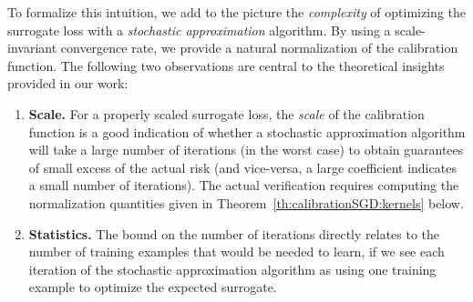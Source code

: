 \documentclass{article}
\begin{document}
To formalize this intuition, we add to the picture the \emph{complexity} of optimizing the surrogate loss with a \emph{stochastic approximation} algorithm.
By using a scale-invariant convergence rate, we provide a natural normalization of the calibration function.
%
The following two observations are central to the theoretical insights provided in our work:
\begin{enumerate}[itemindent=0.45cm,leftmargin=0.0cm,topsep=\parsep]
    \item \textbf{Scale.} For a properly scaled surrogate loss, the \emph{scale} of the calibration function is a good indication of whether a stochastic approximation algorithm will take a large number of iterations (in the worst case) to obtain guarantees of small excess of the actual risk (and vice-versa, a large coefficient indicates a small number of iterations). The actual verification requires computing the normalization quantities given in Theorem~\ref{th:calibrationSGD:kernels} below.
    \item \textbf{Statistics.} The bound on the number of iterations directly relates to the number of training examples that would be needed to learn, if we see each iteration of the stochastic approximation algorithm as using one training example to optimize the expected surrogate.
\end{enumerate}
%
%
\end{document}
